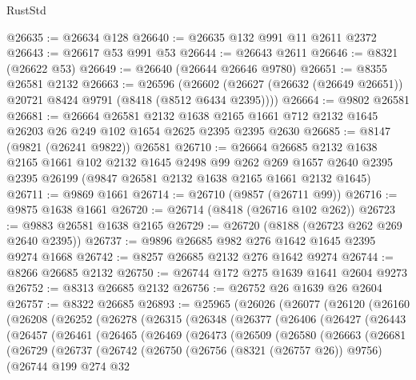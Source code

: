 \begin{lexlean}{RustStd}
\begin{coremodule}
@26635 := @26634 @128
@26640 := @26635 @132 @991 @11 @2611 @2372
@26643 := @26617 @53 @991 @53
@26644 := @26643 @2611
@26646 := @8321 (@26622 @53)
@26649 := @26640 (@26644 @26646 @9780)
@26651 := @8355 @26581 @2132
@26663 := @26596
    (@26602 (@26627 (@26632 (@26649 @26651)) @20721 @8424 @9791 (@8418 (@8512 @6434 @2395))))
@26664 := @9802 @26581
@26681 := @26664
    @26581
    @2132
    @1638
    @2165
    @1661
    @712
    @2132
    @1645
    @26203
    @26
    @249
    @102
    @1654
    @2625
    @2395
    @2395
    @2630
@26685 := @8147 (@9821 (@26241 @9822)) @26581
@26710 := @26664
    @26685
    @2132
    @1638
    @2165
    @1661
    @102
    @2132
    @1645
    @2498
    @99
    @262
    @269
    @1657
    @2640
    @2395
    @2395
    @26199
    (@9847 @26581 @2132 @1638 @2165 @1661 @2132 @1645)
@26711 := @9869 @1661
@26714 := @26710 (@9857 (@26711 @99))
@26716 := @9875 @1638 @1661
@26720 := @26714 (@8418 (@26716 @102 @262))
@26723 := @9883 @26581 @1638 @2165
@26729 := @26720 (@8188 (@26723 @262 @269 @2640 @2395))
@26737 := @9896 @26685 @982 @276 @1642 @1645 @2395 @9274 @1668
@26742 := @8257 @26685 @2132 @276 @1642 @9274
@26744 := @8266 @26685 @2132
@26750 := @26744 @172 @275 @1639 @1641 @2604 @9273
@26752 := @8313 @26685 @2132
@26756 := @26752 @26 @1639 @26 @2604
@26757 := @8322 @26685
@26893 := @25965
    (@26026
      (@26077
        (@26120
          (@26160
            (@26208
              (@26252
                (@26278
                  (@26315
                    (@26348
                      (@26377
                        (@26406
                          (@26427
                            (@26443
                              (@26457
                                (@26461
                                  (@26465
                                    (@26469
                                      (@26473
                                        (@26509
                                          (@26580
                                            (@26663
                                              (@26681
                                                (@26729
                                                  (@26737
                                                    (@26742
                                                      (@26750
                                                        (@26756 (@8321 (@26757 @26)) @9756)
                                                        (@26744
                                                          @199
                                                          @274
                                                          @32

\end{coremodule}
\end{lexlean}
